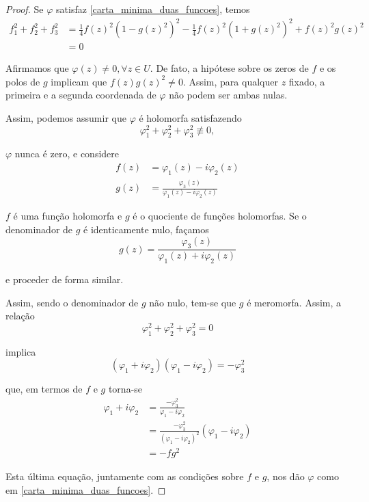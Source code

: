 \begin{proof}
	Se $\varphi$ satisfaz \ref{carta_minima_duas_funcoes}, temos
	\begin{align*}
		f_1^2 + f_2^2 + f_3^2 &= \frac{1}{4} f(z)^2 (1 - g(z)^2)^2 - \frac{1}{4} f(z)^2 (1 + g(z)^2)^2 + f(z)^2 g(z)^2\\
		&= 0
	\end{align*}
	
	Afirmamos que $\varphi(z) \neq 0, \forall z \in U$. De fato, a hipótese sobre os zeros de $f$ e os polos de $g$ implicam que $f(z) g(z)^2 \neq 0$. Assim, para qualquer $z$ fixado, a primeira e a segunda coordenada de $\varphi$ não podem ser ambas nulas.
	
	Assim, podemos assumir que $\varphi$ é holomorfa satisfazendo
	\begin{equation*}
		\varphi_1^2 + \varphi_2^2 + \varphi_3^2 \not\equiv 0,
	\end{equation*}
	
	$\varphi$ nunca é zero, e considere
	\begin{align*}
		f(z) &= \varphi_1(z) - i \varphi_2(z)\\
		g(z) &= \frac{\varphi_3(z)}{\varphi_1(z) - i \varphi_2(z)}
	\end{align*}
	
	$f$ é uma função holomorfa e $g$ é o quociente de funções holomorfas. Se o denominador de $g$ é identicamente nulo, façamos
	\begin{equation*}
		g(z) = \frac{\varphi_3(z)}{\varphi_1(z) + i \varphi_2(z)}
	\end{equation*}
	
	e proceder de forma similar.
	
	Assim, sendo o denominador de $g$ não nulo, tem-se que $g$ é meromorfa. Assim, a relação
	\begin{equation*}
		\varphi_1^2 + \varphi_2^2 + \varphi_3^2 = 0
	\end{equation*}
	
	implica
	\begin{equation*}
		(\varphi_1 + i \varphi_2)(\varphi_1 - i \varphi_2) = -\varphi_3^2
	\end{equation*}
	
	que, em termos de $f$ e $g$ torna-se
	\begin{align*}
		\varphi_1 + i \varphi_2 &= \frac{-\varphi_3^2}{\varphi_1 - i \varphi_2}\\
		&= \frac{-\varphi_3^2}{(\varphi_1 - i \varphi_2)^2} (\varphi_1 - i \varphi_2)\\
		&= -fg^2
	\end{align*}
	
	Esta última equação, juntamente com as condições sobre $f$ e $g$, nos dão $\varphi$ como em \ref{carta_minima_duas_funcoes}.
\end{proof}

